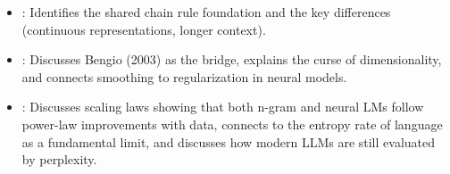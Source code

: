 \begin{interviewq}

\goodgreat
\begin{itemize}
    \item {}: Identifies the shared chain rule foundation and
          the key differences (continuous representations, longer context).
    \item {}: Discusses Bengio (2003) as the bridge, explains the
          curse of dimensionality, and connects smoothing to regularization in
          neural models.
    \item {}: Discusses scaling laws showing that both n-gram
          and neural LMs follow power-law improvements with data, connects
          to the entropy rate of language as a fundamental limit, and discusses
          how modern LLMs are still evaluated by perplexity.
\end{itemize}

\end{interviewq}

\vspace{0.5em}

